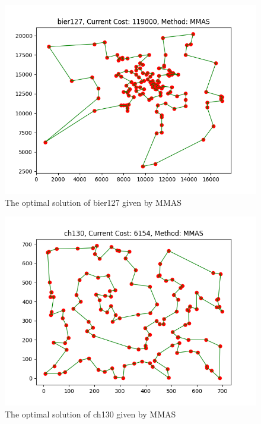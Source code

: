 \documentclass[twocolumn, a4paper]{extarticle}
\begin{document}
\begin{figure}[H]
	\centering
	\includegraphics[width=0.95\linewidth]{figure/mmas_bier127}
	\caption{The optimal solution of bier127 given by MMAS}
	\label{fig:mmasbier127}
\end{figure}

\begin{figure}[H]
	\centering
	\includegraphics[width=0.95\linewidth]{figure/mmas_ch130}
	\caption{The optimal solution of ch130 given by MMAS}
	\label{fig:mmasch130}
\end{figure}
\end{document}
